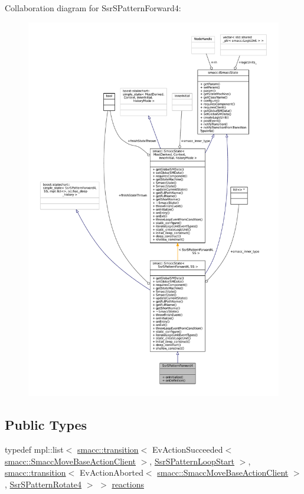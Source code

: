 Collaboration diagram for Ssr\+S\+Pattern\+Forward4\+:
\nopagebreak
\begin{figure}[H]
\begin{center}
\leavevmode
\includegraphics[width=350pt]{structSsrSPatternForward4__coll__graph}
\end{center}
\end{figure}
\subsection*{Public Types}
\begin{DoxyCompactItemize}
\item 
typedef mpl\+::list$<$ \hyperlink{classsmacc_1_1transition}{smacc\+::transition}$<$ Ev\+Action\+Succeeded$<$ \hyperlink{classsmacc_1_1SmaccMoveBaseActionClient}{smacc\+::\+Smacc\+Move\+Base\+Action\+Client} $>$, \hyperlink{structSsrSPatternLoopStart}{Ssr\+S\+Pattern\+Loop\+Start} $>$, \hyperlink{classsmacc_1_1transition}{smacc\+::transition}$<$ Ev\+Action\+Aborted$<$ \hyperlink{classsmacc_1_1SmaccMoveBaseActionClient}{smacc\+::\+Smacc\+Move\+Base\+Action\+Client} $>$, \hyperlink{structSsrSPatternRotate4}{Ssr\+S\+Pattern\+Rotate4} $>$ $>$ \hyperlink{structSsrSPatternForward4_ae4939b34f84c1cf199f8c109394d23ae}{reactions}
\end{DoxyCompactItemize}
